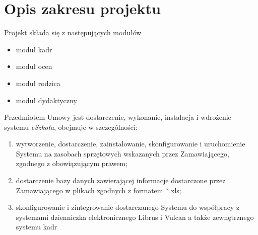 \documentclass{article}
\begin{document}
\section{Opis zakresu projektu}


Projekt składa się z następujących modułów
\begin{itemize}
    \item moduł kadr
    \item moduł ocen
    \item moduł rodzica
    \item moduł dydaktyczny
\end{itemize}

Przedmiotem Umowy jest dostarczenie, wykonanie, instalacja i wdrożenie systemu \textit{eSzkoła}, obejmuje w szczególności:
\begin{enumerate}
    \item wytworzenie, dostarczenie, zainstalowanie, skonfigurowanie i uruchomienie Systemu na zasobach sprzętowych wskazanych przez Zamawiającego, zgodnego z obowiązującym
    prawem;
    \item dostarczenie bazy danych zawierającej informacje dostarczone przez Zamawiającego w plikach zgodnych z formatem *.xls;
    \item skonfigurowanie i zintegrowanie dostarczanego Systemu do współpracy z systemami dzienniczka elektronicznego Librus i Vulcan
    a także zewnętrznego systemu kadr %
\end{enumerate}
\end{document}
